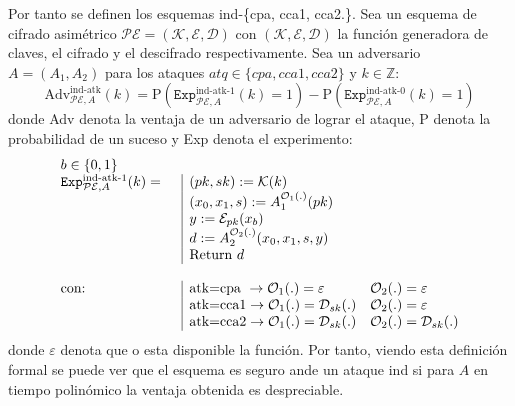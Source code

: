 Por tanto se definen los esquemas \acrshort{ind}-\{\acrshort{cpa}, \acrshort{cca1}, \acrshort{cca2.}\}. Sea un esquema de cifrado asimétrico \(\mathcal{PE}=(\mathcal{K},\mathcal{E},\mathcal{D})\) con \((\mathcal{K},\mathcal{E},\mathcal{D})\) la función generadora de claves, el cifrado y el descifrado respectivamente. Sea un adversario \(A=(A_1,A_2)\) para los ataques \(atq\in \{cpa, cca1, cca2\}\) y \(k\in\mathbb{Z}\):
\begin{equation}
	\text{Adv}_{\mathcal{PE},A}^{\text{ind-atk}}(k)=\text{P}\left(\texttt{Exp}_{\mathcal{PE},A}^{\text{ind-atk-1}}(k)=1\right)-\text{P}\left(\texttt{Exp}_{\mathcal{PE},A}^{\text{ind-atk-0}}(k)=1\right)
\end{equation}
donde Adv denota la ventaja de un adversario de lograr el ataque, P denota la probabilidad de un suceso y Exp denota el experimento:
\begin{equation}
	\begin{array}{llll}
		b\in\{0,1\}&\\
		\texttt{Exp}_{\mathcal{PE},A}^{\text{ind-atk-1}}(k)=&\kern\arraycolsep\vline\kern-\arraycolsep\hfilneg&(pk,sk):=\mathcal{K}(k)\\
		&\kern\arraycolsep\vline\kern-\arraycolsep\hfilneg&(x_0,x_1,s):=A_1^{\mathcal{O}_1(.)}(pk)\\
		&\kern\arraycolsep\vline\kern-\arraycolsep\hfilneg&y:=\mathcal{E}_{pk}(x_b)\\
		&\kern\arraycolsep\vline\kern-\arraycolsep\hfilneg&d:=A_2^{\mathcal{O}_2(.)}(x_0,x_1,s,y)\\
		&\kern\arraycolsep\vline\kern-\arraycolsep\hfilneg&\text{Return } d\\
		\\
		\text{con:}& \kern\arraycolsep\vline\kern-\arraycolsep\hfilneg& \text{atk=cpa }\rightarrow \mathcal{O}_1(.)=\varepsilon & \mathcal{O}_2(.)=\varepsilon\\
		& \kern\arraycolsep\vline\kern-\arraycolsep\hfilneg& \text{atk=cca1}\rightarrow \mathcal{O}_1(.)=\mathcal{D}_{sk}(.) & \mathcal{O}_2(.)=\varepsilon\\
		& \kern\arraycolsep\vline\kern-\arraycolsep\hfilneg& \text{atk=cca2}\rightarrow \mathcal{O}_1(.)=\mathcal{D}_{sk}(.) & \mathcal{O}_2(.)=\mathcal{D}_{sk}(.)\\
	\end{array}
\end{equation}
donde $\varepsilon$ denota que o esta disponible la función. Por tanto, viendo esta definición formal se puede ver que el esquema es seguro ande un ataque \acrshort{ind} si para \(A\) en tiempo polinómico la ventaja obtenida es despreciable.
\newline

